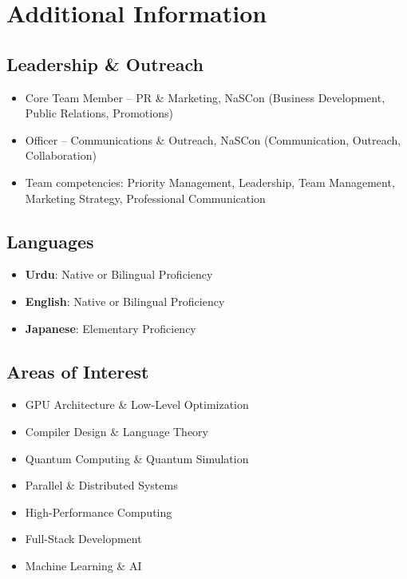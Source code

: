 \documentclass[a4paper,12pt]{article}
\begin{document}
\section{Additional Information}

\subsection*{Leadership \& Outreach}
\begin{itemize}[nosep,after=\strut, leftmargin=1em, itemsep=1pt]
\item Core Team Member – PR \& Marketing, NaSCon (Business Development, Public Relations, Promotions)
\item Officer – Communications \& Outreach, NaSCon (Communication, Outreach, Collaboration)
\item Team competencies: Priority Management, Leadership, Team Management, Marketing Strategy, Professional Communication
\end{itemize}

\subsection*{Languages}
\begin{itemize}[nosep,after=\strut, leftmargin=1em, itemsep=1pt]
\item \textbf{Urdu}: Native or Bilingual Proficiency
\item \textbf{English}: Native or Bilingual Proficiency
\item \textbf{Japanese}: Elementary Proficiency
\end{itemize}

\subsection*{Areas of Interest}
\begin{itemize}[nosep,after=\strut, leftmargin=1em, itemsep=1pt]
\item GPU Architecture \& Low-Level Optimization
\item Compiler Design \& Language Theory
\item Quantum Computing \& Quantum Simulation
\item Parallel \& Distributed Systems
\item High-Performance Computing
\item Full-Stack Development
\item Machine Learning \& AI
\end{itemize}
\end{document}
